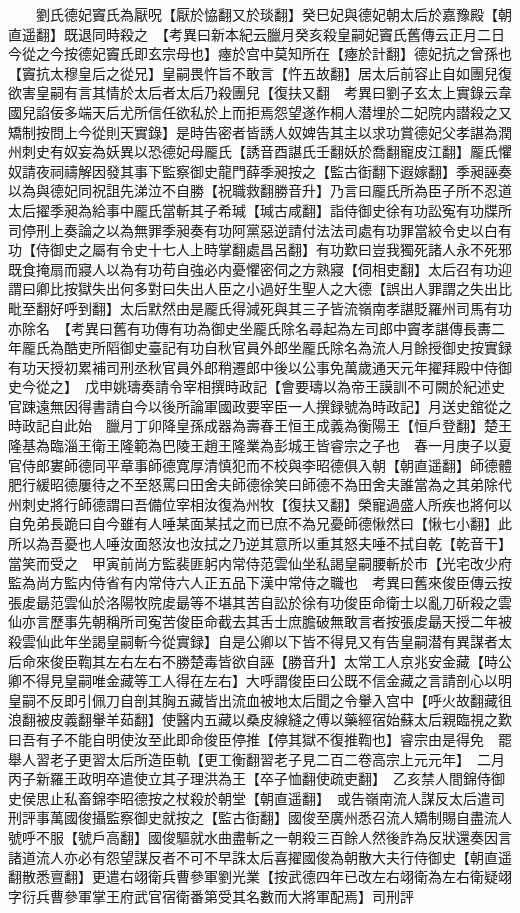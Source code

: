 　　劉氏德妃竇氏為厭呪【厭於恊翻又於琰翻】癸巳妃與德妃朝太后於嘉豫殿【朝直遥翻】既退同時殺之　【考異曰新本紀云臘月癸亥殺皇嗣妃竇氏舊傳云正月二日今從之今按德妃竇氏即玄宗母也】瘞於宫中莫知所在【瘞於計翻】德妃抗之曾孫也【竇抗太穆皇后之從兄】皇嗣畏忤旨不敢言【忤五故翻】居太后前容止自如團兒復欲害皇嗣有言其情於太后者太后乃殺團兒【復扶又翻　考異曰劉子玄太上實錄云韋國兒諂佞多端天后尤所信任欲私於上而拒焉怨望遂作桐人潜埋於二妃院内譛殺之又矯制按問上今從則天實錄】是時告密者皆誘人奴婢告其主以求功賞德妃父孝諶為潤州刺史有奴妄為妖異以恐德妃母龎氏【誘音酉諶氏壬翻妖於喬翻寵皮江翻】龎氏懼奴請夜祠禱解因發其事下監察御史龍門薛季昶按之【監古衘翻下遐嫁翻】季昶誣奏以為與德妃同祝詛先涕泣不自勝【祝職救翻勝音升】乃言曰龎氏所為臣子所不忍道太后擢季昶為給事中龎氏當斬其子希瑊【瑊古咸翻】詣侍御史徐有功訟寃有功牒所司停刑上奏論之以為無罪季昶奏有功阿黨惡逆請付法法司處有功罪當絞令史以白有功【侍御史之屬有令史十七人上時掌翻處昌呂翻】有功歎曰豈我獨死諸人永不死邪既食掩扇而寢人以為有功苟自強必内憂懼密伺之方熟寢【伺相吏翻】太后召有功迎謂曰卿比按獄失出何多對曰失出人臣之小過好生聖人之大德【誤出人罪謂之失出比毗至翻好呼到翻】太后默然由是龎氏得減死與其三子皆流嶺南孝諶貶羅州司馬有功亦除名　【考異曰舊有功傳有功為御史坐龎氏除名尋起為左司郎中竇孝諶傳長夀二年龎氏為酷吏所䧟御史臺記有功自秋官員外郎坐龎氏除名為流人月餘授御史按實録有功天授初累補司刑丞秋官員外郎稍遷郎中後以公事免萬歲通天元年擢拜殿中侍御史今從之】　戊申姚璹奏請令宰相撰時政記【會要璹以為帝王謨訓不可闕於紀述史官踈遠無因得書請自今以後所論軍國政要宰臣一人撰録號為時政記】月送史舘從之時政記自此始　臘月丁卯降皇孫成器為壽春王恒王成義為衡陽王【恒戶登翻】楚王隆基為臨淄王衛王隆範為巴陵王趙王隆業為彭城王皆睿宗之子也　春一月庚子以夏官侍郎婁師德同平章事師德寛厚清慎犯而不校與李昭德俱入朝【朝直遥翻】師德體肥行緩昭德屢待之不至怒罵曰田舍夫師德徐笑曰師德不為田舍夫誰當為之其弟除代州刺史將行師德謂曰吾備位宰相汝復為州牧【復扶又翻】榮寵過盛人所疾也將何以自免弟長跪曰自今雖有人唾某面某拭之而已庶不為兄憂師德愀然曰【愀七小翻】此所以為吾憂也人唾汝面怒汝也汝拭之乃逆其意所以重其怒夫唾不拭自乾【乾音干】當笑而受之　甲寅前尚方監裴匪躬内常侍范雲仙坐私謁皇嗣腰斬於市【光宅改少府監為尚方監内侍省有内常侍六人正五品下漢中常侍之職也　考異曰舊來俊臣傳云按張䖍朂范雲仙於洛陽牧院䖍朂等不堪其苦自訟於徐有功俊臣命衛士以亂刀斫殺之雲仙亦言歷事先朝稱所司寃苦俊臣命截去其舌士庶膽破無敢言者按張䖍朂天授二年被殺雲仙此年坐謁皇嗣斬今從實録】自是公卿以下皆不得見又有告皇嗣潜有異謀者太后命來俊臣鞫其左右左右不勝楚毒皆欲自誣【勝音升】太常工人京兆安金藏【時公卿不得見皇嗣唯金藏等工人得在左右】大呼謂俊臣曰公既不信金藏之言請剖心以明皇嗣不反即引佩刀自剖其胸五藏皆出流血被地太后聞之令轝入宫中【呼火故翻藏徂浪翻被皮義翻轝羊茹翻】使醫内五藏以桑皮線縫之傅以藥經宿始蘇太后親臨視之歎曰吾有子不能自明使汝至此即命俊臣停推【停其獄不復推鞫也】睿宗由是得免　罷舉人習老子更習太后所造臣軌【更工衡翻習老子見二百二卷高宗上元元年】　二月丙子新羅王政明卒遣使立其子理洪為王【卒子恤翻使疏吏翻】　乙亥禁人間錦侍御史侯思止私畜錦李昭德按之杖殺於朝堂【朝直遥翻】　或告嶺南流人謀反太后遣司刑評事萬國俊攝監察御史就按之【監古衘翻】國俊至廣州悉召流人矯制賜自盡流人號呼不服【號戶高翻】國俊驅就水曲盡斬之一朝殺三百餘人然後詐為反狀還奏因言諸道流人亦必有怨望謀反者不可不早誅太后喜擢國俊為朝散大夫行侍御史【朝直遥翻散悉亶翻】更遣右翊衛兵曹參軍劉光業【按武德四年已改左右翊衛為左右衛疑翊字衍兵曹參軍掌王府武官宿衛番第受其名數而大將軍配焉】司刑評
